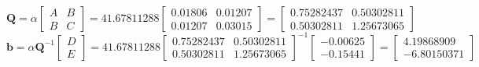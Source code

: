 \begin{enumerate}[a.)]
\[
\mathbf{Q} =\alpha\begin{bmatrix}
    A & B\\ B & C
\end{bmatrix} = 41.67811288
\begin{bmatrix}
    0.01806 & 0.01207 \\
0.01207 & 0.03015
\end{bmatrix} = \begin{bmatrix}
    0.75282437&0.50302811 \\
    0.50302811&1.25673065
    \end{bmatrix}
\]
\[
\mathbf{b} =\alpha \mathbf{Q}^{-1} \begin{bmatrix}
    D\\E
\end{bmatrix} = 41.67811288 \begin{bmatrix}
    0.75282437&0.50302811 \\
    0.50302811&1.25673065
    \end{bmatrix}^{-1}\begin{bmatrix}
    -0.00625 \\
    -0.15441 \end{bmatrix} = \begin{bmatrix}
        4.19868909 \\
        -6.80150371 \end{bmatrix}
\]

\end{enumerate}
